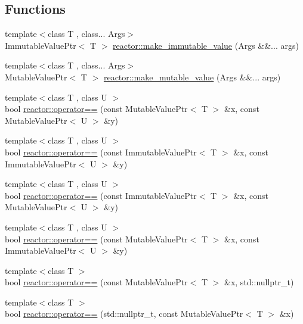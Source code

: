 \subsection*{Functions}
\begin{DoxyCompactItemize}
\item 
{\footnotesize template$<$class T , class... Args$>$ }\\Immutable\+Value\+Ptr$<$ T $>$ \hyperlink{namespacereactor_a8757688a143832a418a763d3621b1c4d}{reactor\+::make\+\_\+immutable\+\_\+value} (Args \&\&... args)
\item 
{\footnotesize template$<$class T , class... Args$>$ }\\Mutable\+Value\+Ptr$<$ T $>$ \hyperlink{namespacereactor_ae4fe60384411a317f354245149b85dbc}{reactor\+::make\+\_\+mutable\+\_\+value} (Args \&\&... args)
\item 
{\footnotesize template$<$class T , class U $>$ }\\bool \hyperlink{namespacereactor_ab9c3123244fedcd98c92e38874bee37d}{reactor\+::operator==} (const Mutable\+Value\+Ptr$<$ T $>$ \&x, const Mutable\+Value\+Ptr$<$ U $>$ \&y)
\item 
{\footnotesize template$<$class T , class U $>$ }\\bool \hyperlink{namespacereactor_a2fdf4cb9154560eba99721c91aa766cc}{reactor\+::operator==} (const Immutable\+Value\+Ptr$<$ T $>$ \&x, const Immutable\+Value\+Ptr$<$ U $>$ \&y)
\item 
{\footnotesize template$<$class T , class U $>$ }\\bool \hyperlink{namespacereactor_ab088f033423a22b03f5f6f76ecb04b1b}{reactor\+::operator==} (const Immutable\+Value\+Ptr$<$ T $>$ \&x, const Mutable\+Value\+Ptr$<$ U $>$ \&y)
\item 
{\footnotesize template$<$class T , class U $>$ }\\bool \hyperlink{namespacereactor_a9079eb51590f5e096fc3d8cfb073540f}{reactor\+::operator==} (const Mutable\+Value\+Ptr$<$ T $>$ \&x, const Immutable\+Value\+Ptr$<$ U $>$ \&y)
\item 
{\footnotesize template$<$class T $>$ }\\bool \hyperlink{namespacereactor_a2155cd0a1349ccb36b00bb369443a084}{reactor\+::operator==} (const Mutable\+Value\+Ptr$<$ T $>$ \&x, std\+::nullptr\+\_\+t)
\item 
{\footnotesize template$<$class T $>$ }\\bool \hyperlink{namespacereactor_a1c5731f8ed4863bfeaaeeba72f5eb765}{reactor\+::operator==} (std\+::nullptr\+\_\+t, const Mutable\+Value\+Ptr$<$ T $>$ \&x)

\end{DoxyCompactItemize}
